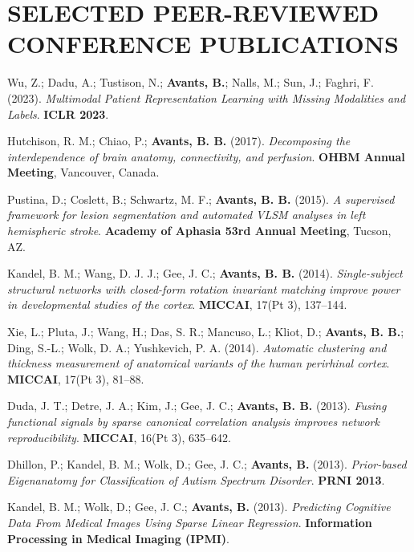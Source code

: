 \documentclass[10pt,letterpaper]{article}
\begin{document}
\section{SELECTED PEER-REVIEWED CONFERENCE PUBLICATIONS}
\begin{enumerate}
{\footnotesize
  \item Wu, Z.; Dadu, A.; Tustison, N.; \textbf{Avants, B.}; Nalls, M.; Sun, J.; Faghri, F. (2023). \textit{Multimodal Patient Representation Learning with Missing Modalities and Labels}. \textbf{ICLR 2023}.
  \item Hutchison, R. M.; Chiao, P.; \textbf{Avants, B. B.} (2017). \textit{Decomposing the interdependence of brain anatomy, connectivity, and perfusion}. \textbf{OHBM Annual Meeting}, Vancouver, Canada.
  \item Pustina, D.; Coslett, B.; Schwartz, M. F.; \textbf{Avants, B. B.} (2015). \textit{A supervised framework for lesion segmentation and automated VLSM analyses in left hemispheric stroke}. \textbf{Academy of Aphasia 53rd Annual Meeting}, Tucson, AZ.
  \item Kandel, B. M.; Wang, D. J. J.; Gee, J. C.; \textbf{Avants, B. B.} (2014). \textit{Single-subject structural networks with closed-form rotation invariant matching improve power in developmental studies of the cortex}. \textbf{MICCAI}, 17(Pt 3), 137--144.
  \item Xie, L.; Pluta, J.; Wang, H.; Das, S. R.; Mancuso, L.; Kliot, D.; \textbf{Avants, B. B.}; Ding, S.-L.; Wolk, D. A.; Yushkevich, P. A. (2014). \textit{Automatic clustering and thickness measurement of anatomical variants of the human perirhinal cortex}. \textbf{MICCAI}, 17(Pt 3), 81--88.
  \item Duda, J. T.; Detre, J. A.; Kim, J.; Gee, J. C.; \textbf{Avants, B. B.} (2013). \textit{Fusing functional signals by sparse canonical correlation analysis improves network reproducibility}. \textbf{MICCAI}, 16(Pt 3), 635--642.
  \item Dhillon, P.; Kandel, B. M.; Wolk, D.; Gee, J. C.; \textbf{Avants, B.} (2013). \textit{Prior-based Eigenanatomy for Classification of Autism Spectrum Disorder}. \textbf{PRNI 2013}.
  \item Kandel, B. M.; Wolk, D.; Gee, J. C.; \textbf{Avants, B.} (2013). \textit{Predicting Cognitive Data From Medical Images Using Sparse Linear Regression}. \textbf{Information Processing in Medical Imaging (IPMI)}.
}
\end{enumerate}
\end{document}
